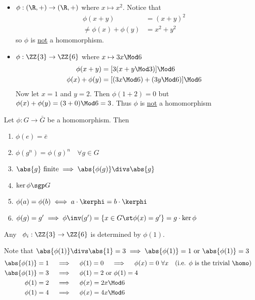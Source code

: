   \begin{nonexamples}
  \begin{itemize}
      \item \(\phi:(\R,+)\to (\R,+)\) where \(x\mapsto x^2\). Notice that
      \begin{align*}
          \phi(x+y)&=(x+y)^2 \\
          \neq \phi(x)+\phi(y) &= x^2+y^2
      \end{align*} so \(\phi\) is \ul{not} a homomorphism.

      \item \(\phi:\ZZ{3}\to\ZZ{6}\) where \(x\mapsto 3x\Mod 6\)
      \begin{align*}
          \phi(x+y) &= [3(x+y\Mod 3)]\Mod 6 \\
          \phi(x)+\phi(y) &= [(3x\Mod 6) + (3y\Mod 6)]\Mod 6
      \end{align*}
      Now let \(x=1\) and \(y=2\). Then \(\phi(1+2)=0\) but \(\phi(x)+\phi(y)=(3+0)\Mod 6 = 3\). Thus \(\phi\) is \ul{not} a homomorphism
  \end{itemize}
  \end{nonexamples}

  \begin{theorem}
      Let \(\phi: G\to\bar G\) be a homomorphism. Then
      \begin{enumerate}
          \item \(\phi(e)=\bar e\)
          \item \(\phi(g^n)=\phi(g)^n\quad \forall g\in G\)
          \item \(\abs{g}\text{ finite} \implies \abs{\phi(g)} \divs \abs{g}\)
          \item \(\ker\phi \sgp G\)
          \item \(\phi(a) = \phi(b) \iff a\cdot\kerphi = b\cdot\kerphi\)
          \item \(\phi(g)=g'\implies \phi\inv(g')=\{x\in G \st \phi(x)=g'\} = g\cdot \ker\phi\)
      \end{enumerate}
  \end{theorem}

  \begin{example}
      Any \homo\ \(\phi_i: \ZZ{3}\to\ZZ{6}\) is determined by \(\phi(1)\).

      Note that \(\abs{\phi (1)} \divs \abs{1} = 3 \implies \abs{\phi (1)}=1 \text{ or } \abs{\phi (1)}=3\)
      \begin{align*}
          \abs{\phi(1)} = 1 \quad &\implies \quad \phi(1)=0 \quad \implies \quad \phi(x)=0\ \forall x \quad \text{(i.e. \(\phi\) is the trivial \homo)} \\
          \abs{\phi(1)} = 3 \quad &\implies \quad \phi(1)=2 \text{ or } \phi(1)=4 \\
          \phi(1) = 2 \quad &\implies \quad \phi(x)=2x \Mod 6 \\
          \phi(1) = 4 \quad &\implies \quad \phi(x)=4x \Mod 6
      \end{align*}
  \end{example}

